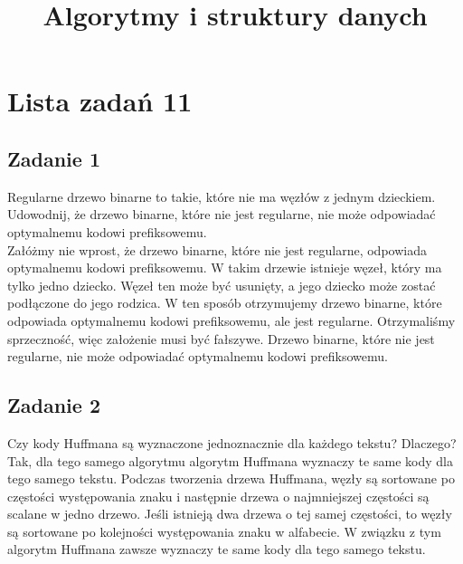 \documentclass{article}
\begin{document}
\title{Algorytmy i struktury danych}
\author{}
\date{}
\maketitle

\section*{Lista zadań 11}

\subsection*{Zadanie 1}
Regularne drzewo binarne to takie, które nie ma węzłów z jednym dzieckiem. Udowodnij, że drzewo
binarne, które nie jest regularne, nie może odpowiadać optymalnemu kodowi prefiksowemu.
\noindent \\[1em]
Załóżmy nie wprost, że drzewo binarne, które nie jest regularne, odpowiada optymalnemu kodowi
prefiksowemu. W takim drzewie istnieje węzeł, który ma tylko jedno dziecko. Węzeł ten może być
usunięty, a jego dziecko może zostać podłączone do jego rodzica. W ten sposób otrzymujemy drzewo
binarne, które odpowiada optymalnemu kodowi prefiksowemu, ale jest regularne. Otrzymaliśmy
sprzeczność, więc założenie musi być fałszywe. Drzewo binarne, które nie jest regularne, nie może
odpowiadać optymalnemu kodowi prefiksowemu.

\subsection*{Zadanie 2}
Czy kody Huffmana są wyznaczone jednoznacznie dla każdego tekstu? Dlaczego?
\noindent \\[1em]
Tak, dla tego samego algorytmu algorytm Huffmana wyznaczy te same kody dla tego samego tekstu.
Podczas tworzenia drzewa Huffmana, węzły są sortowane po częstości występowania znaku i następnie
drzewa o najmniejszej częstości są scalane w jedno drzewo. Jeśli istnieją dwa drzewa o tej samej
częstości, to węzły są sortowane po kolejności występowania znaku w alfabecie. W związku z tym
algorytm Huffmana zawsze wyznaczy te same kody dla tego samego tekstu.
\end{document}
